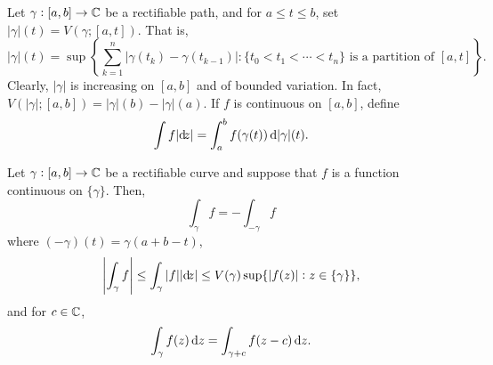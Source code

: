 	\begin{definition}
		Let $\gamma : [a,b] \to \mathbb{C}$ be a rectifiable path, and for $a \le t \le b$, set $|\gamma|(t) = V(\gamma;[a,t])$. That is,
		\[ |\gamma|(t) = \sup\left\{ \sum_{k=1}^{n} |\gamma(t_k) - \gamma(t_{k-1})| : \{ t_0 < t_1 < \cdots < t_n \}\text{ is a partition of }[a,t] \right\}. \]
		Clearly, $|\gamma|$ is increasing on $[a,b]$ and of bounded variation. In fact, $V(|\gamma|;[a,b]) = |\gamma|(b) - |\gamma|(a)$. If $f$ is continuous on $[a,b]$, define
		\[ \int f |{\dif} {z}| = \int_a^b f(\gamma(t)) \dif |\gamma|(t). \]
	\end{definition}

	\begin{ftheo}
		Let $\gamma : [a,b] \to \mathbb{C}$ be a rectifiable curve and suppose that $f$ is a function continuous on $\{\gamma\}$. Then,
		\begin{equation}
			\label{eqn: 2.2}
			\int_\gamma f = - \int_{-\gamma} f
		\end{equation}
		where $(-\gamma)(t) = \gamma(a+b-t)$,
		\begin{equation}
			\label{eqn: 2.3}
			\left| \int_\gamma f \right| \le \int_\gamma |f| |{\dif} {z}| \le V(\gamma) \sup\{ |f(z)| : z \in \{\gamma\} \},
		\end{equation}
		and for $c \in \mathbb{C}$,
		\begin{equation}
			\label{eqn: 2.4}
			\int_\gamma f(z) \dif z = \int_{\gamma + c} f(z-c) \dif z.
		\end{equation}
	\end{ftheo}
